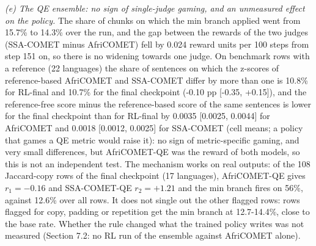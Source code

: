 \emph{(e) The QE ensemble: no sign of single-judge gaming, and an unmeasured effect on the policy.} The share of chunks on which the min branch applied went from 15.7\% to 14.3\% over the run, and the gap between the rewards of the two judges (SSA-COMET minus AfriCOMET) fell by 0.024 reward units per 100 steps from step 151 on, so there is no widening towards one judge. On benchmark rows with a reference (22 languages) the share of sentences on which the z-scores of reference-based AfriCOMET and SSA-COMET differ by more than one is 10.8\% for RL-final and 10.7\% for the final checkpoint (-0.10 pp {[}-0.35, +0.15{]}), and the reference-free score minus the reference-based score of the same sentences is lower for the final checkpoint than for RL-final by 0.0035 {[}0.0025, 0.0044{]} for AfriCOMET and 0.0018 {[}0.0012, 0.0025{]} for SSA-COMET (cell means; a policy that games a QE metric would raise it): no sign of metric-specific gaming, and very small differences, but AfriCOMET-QE was the reward of both models, so this is not an independent test. The mechanism works on real outputs: of the 108 Jaccard-copy rows of the final checkpoint (17 languages), AfriCOMET-QE gives \(r_1=-0.16\) and SSA-COMET-QE \(r_2=+1.21\) and the min branch fires on 56\%, against 12.6\% over all rows. It does not single out the other flagged rows: rows flagged for copy, padding or repetition get the min branch at 12.7-14.4\%, close to the base rate. Whether the rule changed what the trained policy writes was not measured (Section 7.2: no RL run of the ensemble against AfriCOMET alone).

